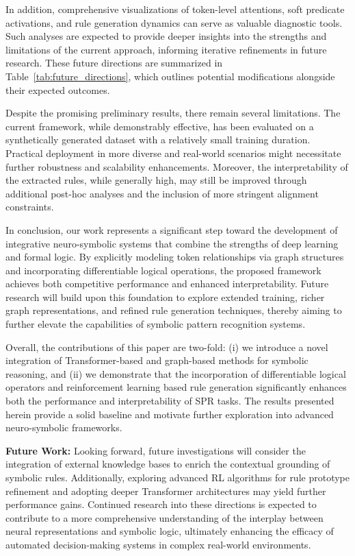 \documentclass{article}
\begin{document}
In addition, comprehensive visualizations of token-level attentions, soft predicate activations, and rule generation dynamics can serve as valuable diagnostic tools. Such analyses are expected to provide deeper insights into the strengths and limitations of the current approach, informing iterative refinements in future research. These future directions are summarized in Table~\ref{tab:future_directions}, which outlines potential modifications alongside their expected outcomes.

Despite the promising preliminary results, there remain several limitations. The current framework, while demonstrably effective, has been evaluated on a synthetically generated dataset with a relatively small training duration. Practical deployment in more diverse and real-world scenarios might necessitate further robustness and scalability enhancements. Moreover, the interpretability of the extracted rules, while generally high, may still be improved through additional post-hoc analyses and the inclusion of more stringent alignment constraints.

In conclusion, our work represents a significant step toward the development of integrative neuro-symbolic systems that combine the strengths of deep learning and formal logic. By explicitly modeling token relationships via graph structures and incorporating differentiable logical operations, the proposed framework achieves both competitive performance and enhanced interpretability. Future research will build upon this foundation to explore extended training, richer graph representations, and refined rule generation techniques, thereby aiming to further elevate the capabilities of symbolic pattern recognition systems.

Overall, the contributions of this paper are two-fold: (i) we introduce a novel integration of Transformer-based and graph-based methods for symbolic reasoning, and (ii) we demonstrate that the incorporation of differentiable logical operators and reinforcement learning based rule generation significantly enhances both the performance and interpretability of SPR tasks. The results presented herein provide a solid baseline and motivate further exploration into advanced neuro-symbolic frameworks.

\vspace{2ex}
\noindent\textbf{Future Work:} Looking forward, future investigations will consider the integration of external knowledge bases to enrich the contextual grounding of symbolic rules. Additionally, exploring advanced RL algorithms for rule prototype refinement and adopting deeper Transformer architectures may yield further performance gains. Continued research into these directions is expected to contribute to a more comprehensive understanding of the interplay between neural representations and symbolic logic, ultimately enhancing the efficacy of automated decision-making systems in complex real-world environments.
\end{document}
